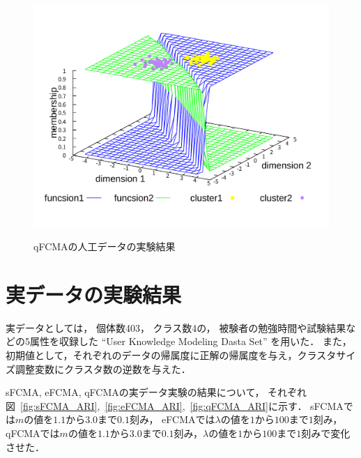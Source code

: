 \documentclass[twocolumn, a4paper]{icethesisabst}
\begin{document}
\begin{figure}[htbp]
\begin{minipage}{0.32\hsize}
  \includegraphics[width=\linewidth]{qFCMA-Em11-Lambda10.pdf}
  \label{fig:qFCMA-Em11-Lambda10}
 \end{minipage}
 \vspace*{0.2cm}
 \caption{qFCMAの人工データの実験結果}
 \label{fig:qFCMA}
\end{figure}


\section{実データの実験結果}
実データとしては，
個体数403，
クラス数4の，
被験者の勉強時間や試験結果などの5属性を収録した
``User Knowledge Modeling Dasta Set''
を用いた．
また，初期値として，それぞれのデータの帰属度に正解の帰属度を与え，クラスタサイズ調整変数にクラスタ数の逆数を与えた．

sFCMA, eFCMA, qFCMAの実データ実験の結果について，
それぞれ図~\ref{fig:sFCMA_ARI},~\ref{fig:eFCMA_ARI},~\ref{fig:qFCMA_ARI}に示す．
sFCMAでは$m$の値を$1.1$から$3.0$まで$0.1$刻み，
eFCMAでは$\lambda$の値を$1$から$100$まで$1$刻み，
qFCMAでは$m$の値を$1.1$から$3.0$まで$0.1$刻み，$\lambda$の値を$1$から$100$まで$1$刻みで変化させた．
\end{document}
